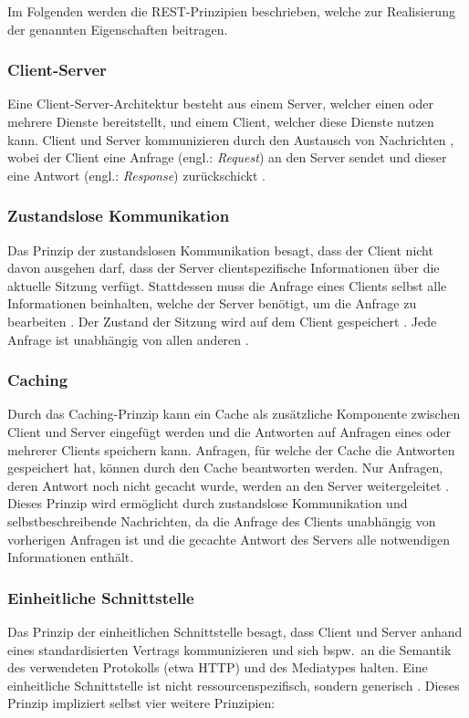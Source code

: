 \para{}Im Folgenden werden die REST-Prinzipien beschrieben, welche zur Realisierung der genannten Eigenschaften beitragen.

\subsubsection{Client-Server}
Eine Client-Server-Architektur besteht aus einem Server, welcher einen oder mehrere Dienste bereitstellt, und einem Client, welcher diese Dienste nutzen kann. Client und Server kommunizieren durch den Austausch von Nachrichten \autocite[Abs.~1.3.]{Bass2012}, wobei der Client eine Anfrage (engl.: \textit{Request}) an den Server sendet und dieser eine Antwort (engl.: \textit{Response}) zurückschickt \autocite[S.~45f., 78]{Fielding2000}.

\subsubsection{Zustandslose Kommunikation}
Das Prinzip der zustandslosen Kommunikation besagt, dass der Client nicht davon ausgehen darf, dass der Server clientspezifische Informationen über die aktuelle Sitzung verfügt. Stattdessen muss die Anfrage eines Clients selbst alle Informationen beinhalten, welche der Server benötigt, um die Anfrage zu bearbeiten \autocite[S.~47, 78f.]{Fielding2000}. Der Zustand der Sitzung wird auf dem Client gespeichert \autocite[Abs.~2.2]{Tilkov2015}. Jede Anfrage ist unabhängig von allen anderen \autocite[S.~349]{Richardson2013}.

\subsubsection{Caching}
Durch das Caching-Prinzip kann ein Cache als zusätzliche Komponente zwischen Client und Server eingefügt werden und die Antworten auf Anfragen eines oder mehrerer Clients speichern kann. Anfragen, für welche der Cache die Antworten gespeichert hat, können durch den Cache beantworten werden. Nur Anfragen, deren Antwort noch nicht gecacht wurde, werden an den Server weitergeleitet \autocite[S.~44, 48, 79f.]{Fielding2000}. Dieses Prinzip wird ermöglicht durch zustandslose Kommunikation und selbstbeschreibende Nachrichten, da die Anfrage des Clients unabhängig von vorherigen Anfragen ist und die gecachte Antwort des Servers alle notwendigen Informationen enthält.

\subsubsection{Einheitliche Schnittstelle}
Das Prinzip der einheitlichen Schnittstelle besagt, dass Client und Server anhand eines standardisierten Vertrags kommunizieren und sich bspw.\ an die Semantik des verwendeten Protokolls (etwa HTTP) und des Mediatypes halten. Eine einheitliche Schnittstelle ist nicht ressourcenspezifisch, sondern generisch \autocite{Fielding2008}. Dieses Prinzip impliziert selbst vier weitere Prinzipien:

